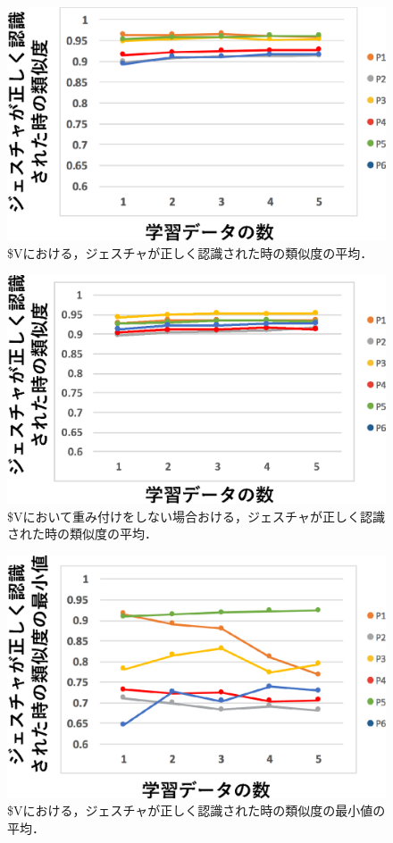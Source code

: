 \begin{figure}[!h]
\centering
\includegraphics[width=0.7\columnwidth]{img/rec_sim.eps}
\caption{\$Vにおける，ジェスチャが正しく認識された時の類似度の平均．}
\label{fig:rec_sim}
\end{figure}

\begin{figure}[!h]
\centering
\includegraphics[width=0.7\columnwidth]{img/rec_sim_10.eps}
\caption{\$Vにおいて重み付けをしない場合おける，ジェスチャが正しく認識された時の類似度の平均．}
\label{fig:rec_sim_10}
\end{figure}

\begin{figure}[!h]
\centering
\includegraphics[width=0.7\columnwidth]{img/rec_min.eps}
\caption{\$Vにおける，ジェスチャが正しく認識された時の類似度の最小値の平均．}
\label{fig:rec_min}
\end{figure}

